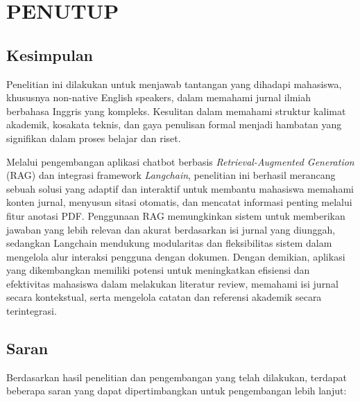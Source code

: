 \chapter{PENUTUP}
\section{Kesimpulan}

Penelitian ini dilakukan untuk menjawab tantangan yang dihadapi mahasiswa, khususnya non-native English speakers, dalam memahami jurnal ilmiah berbahasa Inggris yang kompleks. Kesulitan dalam memahami struktur kalimat akademik, kosakata teknis, dan gaya penulisan formal menjadi hambatan yang signifikan dalam proses belajar dan riset. 
\singlespacing{}

Melalui pengembangan aplikasi chatbot berbasis \textit{Retrieval-Augmented Generation} (RAG) dan integrasi framework \textit{Langchain}, penelitian ini berhasil merancang sebuah solusi yang adaptif dan interaktif untuk membantu mahasiswa memahami konten jurnal, menyusun sitasi otomatis, dan mencatat informasi penting melalui fitur anotasi PDF. Penggunaan RAG memungkinkan sistem untuk memberikan jawaban yang lebih relevan dan akurat berdasarkan isi jurnal yang diunggah, sedangkan Langchain mendukung modularitas dan fleksibilitas sistem dalam mengelola alur interaksi pengguna dengan dokumen.
\singlespacing{}
Dengan demikian, aplikasi yang dikembangkan memiliki potensi untuk meningkatkan efisiensi dan efektivitas mahasiswa dalam melakukan literatur review, memahami isi jurnal secara kontekstual, serta mengelola catatan dan referensi akademik secara terintegrasi.

\section{Saran}

Berdasarkan hasil penelitian dan pengembangan yang telah dilakukan, terdapat beberapa saran yang dapat dipertimbangkan untuk pengembangan lebih lanjut:

